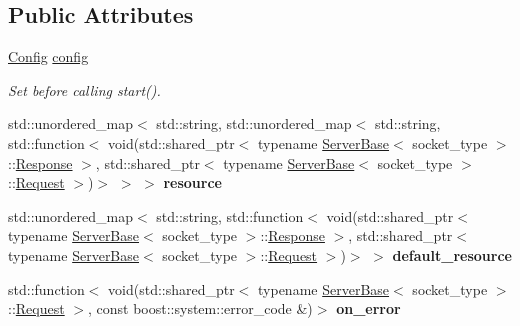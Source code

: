 \subsection*{Public Attributes}
\begin{DoxyCompactItemize}
\item 
\mbox{\label{classhttp_1_1_server_base_a3de3bc83a8f6493784ee6a8dcd3f462c}} 
\hyperlink{classhttp_1_1_server_base_1_1_config}{Config} \hyperlink{classhttp_1_1_server_base_a3de3bc83a8f6493784ee6a8dcd3f462c}{config}
\begin{DoxyCompactList}\small\item\em Set before calling start(). \end{DoxyCompactList}\item 
\mbox{\label{classhttp_1_1_server_base_a2850b0140e9a076919665fe7609d0d01}} 
std\+::unordered\+\_\+map$<$ std\+::string, std\+::unordered\+\_\+map$<$ std\+::string, std\+::function$<$ void(std\+::shared\+\_\+ptr$<$ typename \hyperlink{classhttp_1_1_server_base}{Server\+Base}$<$ socket\+\_\+type $>$\+::\hyperlink{classhttp_1_1_server_base_1_1_response}{Response} $>$, std\+::shared\+\_\+ptr$<$ typename \hyperlink{classhttp_1_1_server_base}{Server\+Base}$<$ socket\+\_\+type $>$\+::\hyperlink{classhttp_1_1_server_base_1_1_request}{Request} $>$)$>$ $>$ $>$ {\bfseries resource}
\item 
\mbox{\label{classhttp_1_1_server_base_a657b6923feeeb6cbe2041e9b93d76441}} 
std\+::unordered\+\_\+map$<$ std\+::string, std\+::function$<$ void(std\+::shared\+\_\+ptr$<$ typename \hyperlink{classhttp_1_1_server_base}{Server\+Base}$<$ socket\+\_\+type $>$\+::\hyperlink{classhttp_1_1_server_base_1_1_response}{Response} $>$, std\+::shared\+\_\+ptr$<$ typename \hyperlink{classhttp_1_1_server_base}{Server\+Base}$<$ socket\+\_\+type $>$\+::\hyperlink{classhttp_1_1_server_base_1_1_request}{Request} $>$)$>$ $>$ {\bfseries default\+\_\+resource}
\item 
\mbox{\label{classhttp_1_1_server_base_adb62a957b8e39c5cab516faac94add97}} 
std\+::function$<$ void(std\+::shared\+\_\+ptr$<$ typename \hyperlink{classhttp_1_1_server_base}{Server\+Base}$<$ socket\+\_\+type $>$\+::\hyperlink{classhttp_1_1_server_base_1_1_request}{Request} $>$, const boost\+::system\+::error\+\_\+code \&)$>$ {\bfseries on\+\_\+error}

\end{DoxyCompactItemize}
